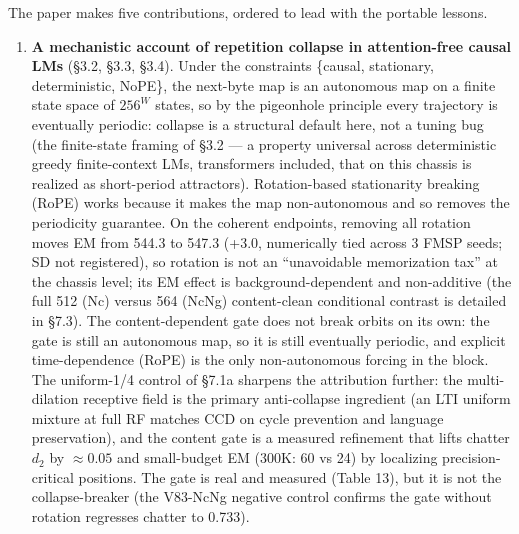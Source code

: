 \documentclass[11pt]{article}
\begin{document}
The paper makes five contributions, ordered to lead with the portable lessons.

\begin{enumerate}
\item \textbf{A mechanistic account of repetition collapse in attention-free causal LMs} (\S3.2, \S3.3, \S3.4). Under the constraints \{causal, stationary, deterministic, NoPE\}, the next-byte map is an autonomous map on a finite state space of $256^W$ states, so by the pigeonhole principle every trajectory is eventually periodic: collapse is a structural default here, not a tuning bug (the finite-state framing of \S3.2 --- a property universal across deterministic greedy finite-context LMs, transformers included, that on this chassis is realized as short-period attractors). Rotation-based stationarity breaking (RoPE) works because it makes the map non-autonomous and so removes the periodicity guarantee. On the coherent endpoints, removing all rotation moves EM from 544.3 to 547.3 (+3.0, numerically tied across 3 FMSP seeds; SD not registered), so rotation is not an ``unavoidable memorization tax'' at the chassis level; its EM effect is background-dependent and non-additive (the full 512 (Nc) versus 564 (NcNg) content-clean conditional contrast is detailed in \S7.3). The content-dependent gate does not break orbits on its own: the gate is still an autonomous map, so it is still eventually periodic, and explicit time-dependence (RoPE) is the only non-autonomous forcing in the block. The uniform-1/4 control of \S7.1a sharpens the attribution further: the multi-dilation receptive field is the primary anti-collapse ingredient (an LTI uniform mixture at full RF matches CCD on cycle prevention and language preservation), and the content gate is a measured refinement that lifts chatter $d_2$ by $\approx 0.05$ and small-budget EM (300K: 60 vs 24) by localizing precision-critical positions. The gate is real and measured (Table 13), but it is not the collapse-breaker (the V83-NcNg negative control confirms the gate without rotation regresses chatter to 0.733).


\end{enumerate}
\end{document}
